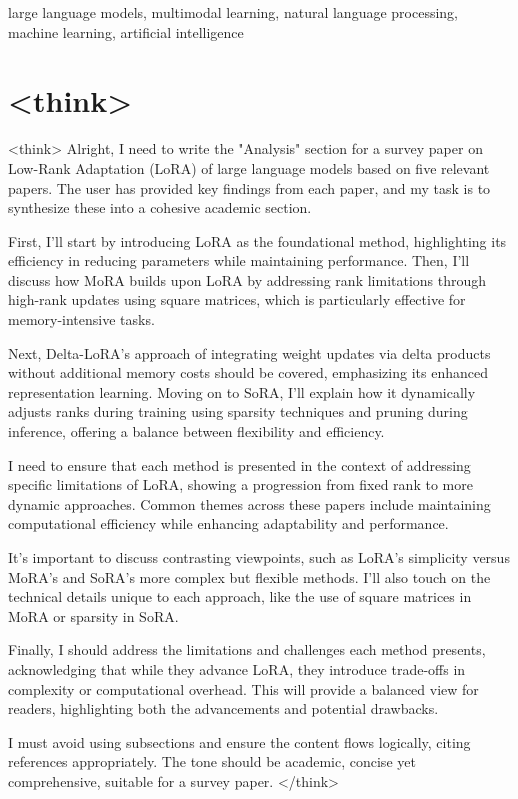 \documentclass[conference]{IEEEtran}
\begin{document}
\begin{IEEEkeywords}
large language models, multimodal learning, natural language processing, machine learning, artificial intelligence
\end{IEEEkeywords}


\section{<think>}
<think>
Alright, I need to write the "Analysis" section for a survey paper on Low-Rank Adaptation (LoRA) of large language models based on five relevant papers. The user has provided key findings from each paper, and my task is to synthesize these into a cohesive academic section.

First, I'll start by introducing LoRA as the foundational method, highlighting its efficiency in reducing parameters while maintaining performance. Then, I'll discuss how MoRA builds upon LoRA by addressing rank limitations through high-rank updates using square matrices, which is particularly effective for memory-intensive tasks.

Next, Delta-LoRA's approach of integrating weight updates via delta products without additional memory costs should be covered, emphasizing its enhanced representation learning. Moving on to SoRA, I'll explain how it dynamically adjusts ranks during training using sparsity techniques and pruning during inference, offering a balance between flexibility and efficiency.

I need to ensure that each method is presented in the context of addressing specific limitations of LoRA, showing a progression from fixed rank to more dynamic approaches. Common themes across these papers include maintaining computational efficiency while enhancing adaptability and performance.

It's important to discuss contrasting viewpoints, such as LoRA's simplicity versus MoRA's and SoRA's more complex but flexible methods. I'll also touch on the technical details unique to each approach, like the use of square matrices in MoRA or sparsity in SoRA.

Finally, I should address the limitations and challenges each method presents, acknowledging that while they advance LoRA, they introduce trade-offs in complexity or computational overhead. This will provide a balanced view for readers, highlighting both the advancements and potential drawbacks.

I must avoid using subsections and ensure the content flows logically, citing references appropriately. The tone should be academic, concise yet comprehensive, suitable for a survey paper.
</think>
\end{document}
